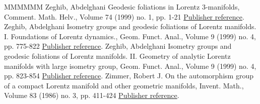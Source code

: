 \begin{thebibliography}{MMMMMM}
 Zeghib, Abdelghani Geodesic foliations in Lorentz 3-manifolds, Comment. Math. Helv., Volume 74 (1999) no. 1, pp. 1-21 \href{https://ahl.centre-mersenne.org/item/AHL_2020__3__407_0/#zeghibfoliation}{Publisher reference}.
 Zeghib, Abdelghani Isometry groups and geodesic foliations of Lorentz manifolds. I. Foundations of Lorentz dynamics., Geom. Funct. Anal., Volume 9 (1999) no. 4, pp. 775-822 \href{https://ahl.centre-mersenne.org/item/AHL_2020__3__407_0/#zeghibisom1}{Publisher reference}.
 Zeghib, Abdelghani Isometry groups and geodesic foliations of Lorentz manifolds. II. Geometry of analytic Lorentz manifolds with large isometry group, Geom. Funct. Anal., Volume 9 (1999) no. 4, pp. 823-854 \href{https://ahl.centre-mersenne.org/item/AHL_2020__3__407_0/#zeghibisom2}{Publisher reference}.
 Zimmer, Robert J. On the automorphism group of a compact Lorentz manifold and other geometric manifolds, Invent. Math., Volume 83 (1986) no. 3, pp. 411-424 \href{https://ahl.centre-mersenne.org/item/AHL_2020__3__407_0/#zimmer.iso}{Publisher reference}.
\end{thebibliography}
